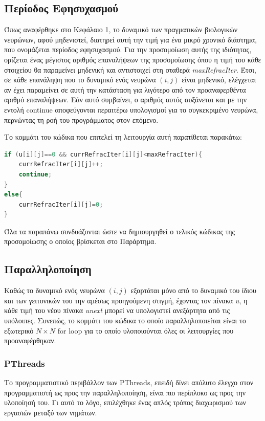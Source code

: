 \documentclass[12pt,a4paper]{article}
\begin{document}
\subsection{Περίοδος Εφησυχασμού}

Όπως αναφέρθηκε στο Κεφάλαιο 1, το δυναμικό των πραγματικών βιολογικών νευρώνων, αφού μηδενιστεί, διατηρεί αυτή την τιμή για ένα μικρό χρονικό διάστημα, που ονομάζεται περίοδος εφησυχασμού. Για την προσομοίωση αυτής της ιδιότητας, ορίζεται ένας μέγιστος αριθμός επαναλήψεων της προσομοίωσης όπου η τιμή του κάθε στοιχείου θα παραμείνει μηδενική και αντιστοιχεί στη σταθερά \textit{maxRefracIter}. Έτσι, σε κάθε επανάληψη που το δυναμικό ενός νευρώνα $(i,j)$ είναι μηδενικό, ελέγχεται αν έχει παραμείνει σε αυτή την κατάσταση για λιγότερο από τον προαναφερθέντα αριθμό επαναλήψεων. Εάν αυτό συμβαίνει, ο αριθμός αυτός αυξάνεται και με την εντολή continue αποφεύγονται περαιτέρω υπολογισμοί για το συγκεκριμένο νευρώνα, περνώντας τη ροή του προγράμματος στον επόμενο.

Το κομμάτι του κώδικα που επιτελεί τη λειτουργία αυτή παρατίθεται παρακάτω:
\begin{lstlisting}[language=C,frame=single]
if (u[i][j]==0 && currRefracIter[i][j]<maxRefracIter){
	currRefracIter[i][j]++;
	continue;
}
else{
	currRefracIter[i][j]=0;
}
\end{lstlisting}

Όλα τα παραπάνω συνδυάζονται ώστε να δημιουργηθεί ο τελικός κώδικας της προσομοίωσης ο οποίος βρίσκεται στο Παράρτημα. 

\subsection{Παραλληλοποίηση}

Καθώς το δυναμικό ενός νευρώνα $(i,j)$ εξαρτάται μόνο από το δυναμικό του ίδιου και των γειτονικών του την αμέσως προηγούμενη στιγμή, έχοντας τον πίνακα \textit{u}, η κάθε τιμή του νέου πίνακα \textit{unext} μπορεί να υπολογιστεί ανεξάρτητα από τις υπόλοιπες. Συνεπώς, το κομμάτι του κώδικα το οποίο παραλληλοποιείται είναι το εξωτερικό $N \times N$ for loop για το οποίο υλοποιούνται όλες οι λειτουργίες που προαναφέρθηκαν.

\subsubsection{PThreads}
Το προγραμματιστικό περιβάλλον των PThreads, επειδή δίνει απόλυτο έλεγχο στον προγραμματιστή ως προς την παραλληλοποίηση, είναι πιο περίπλοκο ως προς την υλοποίησή του. Γι αυτό το λόγο, επιλέχθηκε ένας απλός τρόπος διαχωρισμού των εργασιών μεταξύ των νημάτων.
\end{document}
